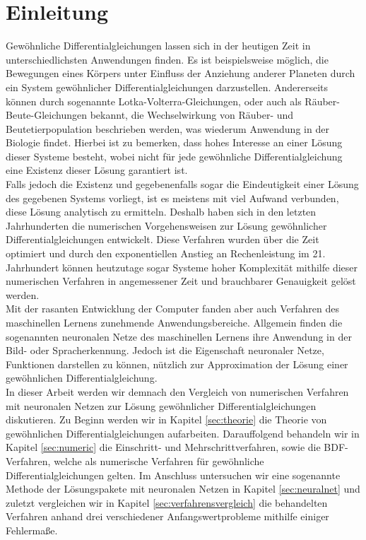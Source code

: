 \section{Einleitung}
\label{sec:einleitung}
Gewöhnliche Differentialgleichungen lassen sich in der heutigen Zeit in unterschiedlichsten Anwendungen finden.
Es ist beispielsweise möglich, die Bewegungen eines Körpers unter Einfluss der Anziehung anderer Planeten durch
ein System gewöhnlicher Differentialgleichungen darzustellen. Andererseits können durch sogenannte
Lotka-Volterra-Gleichungen, oder auch als Räuber-Beute-Gleichungen bekannt, die Wechselwirkung von Räuber- und
Beutetierpopulation beschrieben werden, was wiederum Anwendung in der Biologie findet. Hierbei ist zu bemerken, dass hohes
Interesse an einer Lösung dieser Systeme besteht, wobei nicht für jede gewöhnliche Differentialgleichung eine Existenz
dieser Lösung garantiert ist.\\
Falls jedoch die Existenz und gegebenenfalls sogar die Eindeutigkeit einer Lösung des gegebenen Systems vorliegt, ist es
meistens mit viel Aufwand verbunden, diese Lösung analytisch zu ermitteln. Deshalb haben sich in den letzten
Jahrhunderten die numerischen Vorgehensweisen zur Lösung gewöhnlicher Differentialgleichungen entwickelt.
Diese Verfahren wurden über die Zeit optimiert und durch den exponentiellen Anstieg an Rechenleistung im 21. Jahrhundert
können heutzutage sogar Systeme hoher Komplexität mithilfe dieser numerischen Verfahren in angemessener Zeit und
brauchbarer Genauigkeit gelöst werden. \\
Mit der rasanten Entwicklung der Computer fanden aber auch Verfahren des maschinellen Lernens zunehmende
Anwendungsbereiche. Allgemein finden die sogenannten neuronalen Netze des maschinellen Lernens ihre Anwendung
in der Bild- oder Spracherkennung. Jedoch ist die Eigenschaft neuronaler Netze, Funktionen darstellen zu
können, nützlich zur Approximation der Lösung einer gewöhnlichen Differentialgleichung. \\
In dieser Arbeit werden wir demnach den Vergleich von numerischen Verfahren mit neuronalen Netzen zur Lösung
gewöhnlicher Differentialgleichungen diskutieren. Zu Beginn werden wir in Kapitel \ref{sec:theorie} die Theorie von
gewöhnlichen Differentialgleichungen aufarbeiten. Darauffolgend behandeln wir in Kapitel \ref{sec:numeric}
die Einschritt- und Mehrschrittverfahren, sowie die BDF-Verfahren, welche als numerische Verfahren für gewöhnliche
Differentialgleichungen gelten.
Im Anschluss untersuchen wir eine sogenannte Methode der Lösungspakete mit neuronalen Netzen in
Kapitel \ref{sec:neuralnet} und zuletzt vergleichen wir in Kapitel \ref{sec:verfahrensvergleich} die behandelten
Verfahren anhand drei verschiedener Anfangswertprobleme mithilfe einiger Fehlermaße.
\newpage

